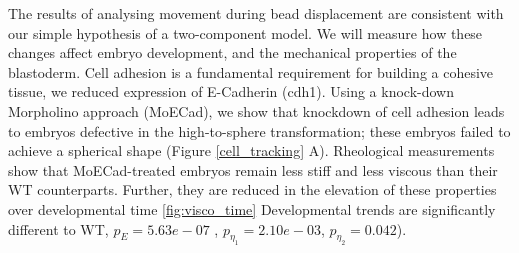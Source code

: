 The results of analysing %
movement during bead displacement are consistent with our simple hypothesis of a two-component model.
We will measure how these changes affect embryo development, %
and the mechanical properties of the blastoderm.
Cell adhesion is a fundamental requirement for building a cohesive tissue, we reduced expression of E-Cadherin (cdh1).
Using a knock-down Morpholino approach (MoECad), we show that knockdown of cell adhesion leads to embryos defective in the high-to-sphere transformation; these embryos failed to achieve a spherical shape (Figure \ref{cell_tracking} A).
Rheological measurements show that MoECad-treated embryos remain less stiff and less viscous than their WT counterparts.
Further, they are reduced in the elevation of these properties over developmental time \ref{fig:visco_time}
Developmental trends are significantly different to WT, $p_E = 5.63e-07$ , $p_{\eta_1} = 2.10e-03$, $p_{\eta_2} =0.042$).


